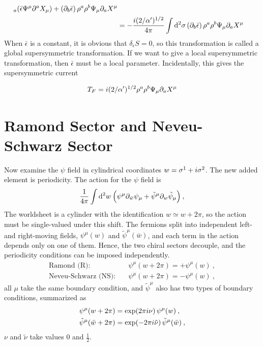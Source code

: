 \begin{tcolorbox}[breakable]
\begin{align*}
		_{a}( \bar{\epsilon}\Psi ^{\mu }\partial ^{a}X_{\mu }) +\left(
		\partial _{b}\bar{\epsilon}\right) \rho ^{a}\rho ^{b}\Psi _{\mu }\partial
		_{a}X^{\mu } \\
		&=-\frac{i(2/\alpha ^{\prime })^{1/2}}{4\pi }\int \mathrm{d}^{2}\sigma \left(
		\partial _{b}\bar{\epsilon}\right) \rho ^{a}\rho ^{b}\Psi _{\mu }\partial
		_{a}X^{\mu }
	\end{align*}
	When $\bar{\epsilon}$ is a constant, it is obvious that $\delta_{\epsilon}S=0$, so this transformation is called a global supersymmetric transformation. If we want to give a local supersymmetric transformation, then $\bar{\epsilon}$ must be a local parameter. Incidentally, this gives the supersymmetric current
	
	\begin{equation}
		T_{F}=i(2/\alpha ^{\prime })^{1/2} \rho ^{a}\rho ^{b}\Psi _{\mu }\partial_{a}X^{\mu }
	\end{equation}
\end{tcolorbox}
	
	\section{Ramond Sector and Neveu-Schwarz Sector}
	Now examine the $\psi$ field in cylindrical coordinates $w=\sigma^{1}+i\sigma^{2}$. The new added element is periodicity. The action for the $\psi$ field is
	\begin{equation}
		\frac{1}{4\pi}\int \mathrm{d}^{2} w\: \Bigl(\psi^{\mu}\partial_{\bar{w}}\psi_{\mu}
		+\tilde{\psi}^{\mu}\partial_{w}\tilde{\psi}_{\mu} \Bigr) \:, \label{10.2.1}
	\end{equation}
	The worldsheet is a cylinder with the identification $w \simeq w+2\pi$, so the action must be single-valued under this shift. The fermions split into independent left- and right-moving fields, $\psi^\mu(w)$ and $\tilde{\psi}^\mu(\bar w)$, and each term in the action depends only on one of them. Hence, the two chiral sectors decouple, and the periodicity conditions can be imposed independently.
	\begin{subequations}
		\begin{align}
			\text{Ramond (R)}:&\quad \psi^{\mu}(w+2\pi)= +\psi^{\mu}(w) \:, \label{10.2.2a} \\
			\text{Neveu-Schwarz (NS)}:&\quad \psi^{\mu}(w+2\pi)=-\psi^{\mu}(w) \:, \label{10.2.2b}
		\end{align}    
	\end{subequations}
	all $\mu$ take the same boundary condition, and $\tilde{\psi}^{\mu}$ also has two types of boundary conditions, summarized as
	\begin{subequations}
		\begin{align}
			\psi^{\mu}(w+2\pi) &= \exp(2\pi i\nu)\, \psi^{\mu}(w) \:, \label{10.2.3a} \\
			\tilde{\psi}^{\mu}(\bar{w}+2\pi)&= \exp(-2\pi i\tilde{\nu})\,\tilde{\psi}^{\mu}(\bar{w}) \:, \label{10.2.3b} 
		\end{align}
	\end{subequations}
	$\nu$ and $\tilde{\nu}$ take values $0$ and $\frac{1}{2}$.
	
